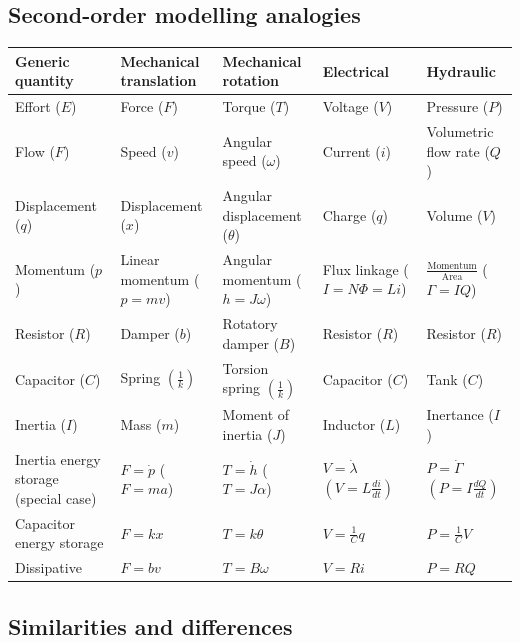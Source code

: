 \documentclass[11pt]{article}
\begin{document}
\subsection{Second-order modelling analogies}
\label{sec:org65970c1}
\begin{center}
\begin{tabularx}{1.2\textwidth}{| >{\centering\arraybackslash}X| >{\centering\arraybackslash}X| >{\centering\arraybackslash}X| >{\centering\arraybackslash}X| >{\centering\arraybackslash}X|}
\hline
Generic quantity & Mechanical translation & Mechanical rotation & Electrical & Hydraulic\\
\hline
Effort (\(E\)) & Force (\(F\)) & Torque (\(T\)) & Voltage (\(V\)) & Pressure (\(P\))\\
\hline
Flow (\(F\)) & Speed (\(v\)) & Angular speed (\(\omega\)) & Current (\(i\)) & Volumetric flow rate (\(Q\))\\
\hline
Displacement (\(q\)) & Displacement (\(x\)) & Angular displacement (\(\theta\)) & Charge (\(q\)) & Volume (\(V\))\\
\hline
Momentum (\(p\)) & Linear momentum (\(p = mv\)) & Angular momentum (\(h = J \omega\)) & Flux linkage (\(I = N \Phi = Li\)) & \(\frac{\text{Momentum}}{\text{Area}}\) (\(\Gamma = IQ\))\\
\hline
Resistor (\(R\)) & Damper (\(b\)) & Rotatory damper (\(B\)) & Resistor (\(R\)) & Resistor (\(R\))\\
\hline
Capacitor (\(C\)) & Spring \(\left(\frac{1}{k} \right)\) & Torsion spring \(\left(\frac{1}{k} \right)\) & Capacitor (\(C\)) & Tank (\(C\))\\
\hline
Inertia (\(I\)) & Mass (\(m\)) & Moment of inertia (\(J\)) & Inductor (\(L\)) & Inertance (\(I\))\\
\hline
Inertia energy storage (special case) & \(F = \dot{p}\) (\(F = ma\)) & \(T = \dot{h}\) (\(T = J \alpha\)) & \(V = \dot{\lambda}\) \(\left(V = L \frac{di}{dt} \right)\) & \(P = \dot{\Gamma}\) \(\left(P = I \frac{dQ}{dt} \right)\)\\
\hline
Capacitor energy storage & \(F = kx\) & \(T = k \theta\) & \(V = \frac{1}{C} q\) & \(P = \frac{1}{C} V\)\\
\hline
Dissipative & \(F = bv\) & \(T = B \omega\) & \(V = Ri\) & \(P = RQ\)\\
\hline
\end{tabularx}
\end{center}

 \newpage
\subsection{Similarities and differences}
\label{sec:org83904a7}
\end{document}
